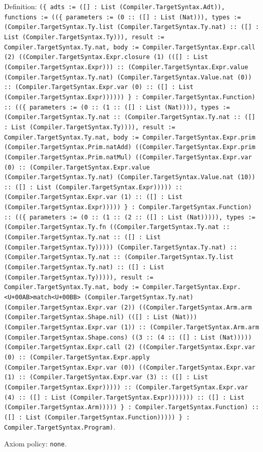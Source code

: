 \documentclass[11pt]{article}
\begin{document}
\noindent Definition: \texttt{(\{ adts := ([] : List (Compiler.TargetSyntax.Adt)), functions := ((\{ parameters := (0 :: ([] : List (Nat))), types := (Compiler.TargetSyntax.Ty.list (Compiler.TargetSyntax.Ty.nat) :: ([] : List (Compiler.TargetSyntax.Ty))), result := Compiler.TargetSyntax.Ty.nat, body := Compiler.TargetSyntax.Expr.call (2) ((Compiler.TargetSyntax.Expr.closure (1) (([] : List (Compiler.TargetSyntax.Expr))) :: (Compiler.TargetSyntax.Expr.value (Compiler.TargetSyntax.Ty.nat) (Compiler.TargetSyntax.Value.nat (0)) :: (Compiler.TargetSyntax.Expr.var (0) :: ([] : List (Compiler.TargetSyntax.Expr)))))) \} : Compiler.TargetSyntax.Function) :: ((\{ parameters := (0 :: (1 :: ([] : List (Nat)))), types := (Compiler.TargetSyntax.Ty.nat :: (Compiler.TargetSyntax.Ty.nat :: ([] : List (Compiler.TargetSyntax.Ty)))), result := Compiler.TargetSyntax.Ty.nat, body := Compiler.TargetSyntax.Expr.prim (Compiler.TargetSyntax.Prim.natAdd) ((Compiler.TargetSyntax.Expr.prim (Compiler.TargetSyntax.Prim.natMul) ((Compiler.TargetSyntax.Expr.var (0) :: (Compiler.TargetSyntax.Expr.value (Compiler.TargetSyntax.Ty.nat) (Compiler.TargetSyntax.Value.nat (10)) :: ([] : List (Compiler.TargetSyntax.Expr))))) :: (Compiler.TargetSyntax.Expr.var (1) :: ([] : List (Compiler.TargetSyntax.Expr))))) \} : Compiler.TargetSyntax.Function) :: ((\{ parameters := (0 :: (1 :: (2 :: ([] : List (Nat))))), types := (Compiler.TargetSyntax.Ty.fn ((Compiler.TargetSyntax.Ty.nat :: (Compiler.TargetSyntax.Ty.nat :: ([] : List (Compiler.TargetSyntax.Ty))))) (Compiler.TargetSyntax.Ty.nat) :: (Compiler.TargetSyntax.Ty.nat :: (Compiler.TargetSyntax.Ty.list (Compiler.TargetSyntax.Ty.nat) :: ([] : List (Compiler.TargetSyntax.Ty))))), result := Compiler.TargetSyntax.Ty.nat, body := Compiler.TargetSyntax.Expr.<U+00AB>match<U+00BB> (Compiler.TargetSyntax.Ty.nat) (Compiler.TargetSyntax.Expr.var (2)) ((Compiler.TargetSyntax.Arm.arm (Compiler.TargetSyntax.Shape.nil) (([] : List (Nat))) (Compiler.TargetSyntax.Expr.var (1)) :: (Compiler.TargetSyntax.Arm.arm (Compiler.TargetSyntax.Shape.cons) ((3 :: (4 :: ([] : List (Nat))))) (Compiler.TargetSyntax.Expr.call (2) ((Compiler.TargetSyntax.Expr.var (0) :: (Compiler.TargetSyntax.Expr.apply (Compiler.TargetSyntax.Expr.var (0)) ((Compiler.TargetSyntax.Expr.var (1) :: (Compiler.TargetSyntax.Expr.var (3) :: ([] : List (Compiler.TargetSyntax.Expr))))) :: (Compiler.TargetSyntax.Expr.var (4) :: ([] : List (Compiler.TargetSyntax.Expr))))))) :: ([] : List (Compiler.TargetSyntax.Arm))))) \} : Compiler.TargetSyntax.Function) :: ([] : List (Compiler.TargetSyntax.Function))))) \} : Compiler.TargetSyntax.Program)}.\par
\noindent Axiom policy: \texttt{none}.\par
\end{document}
